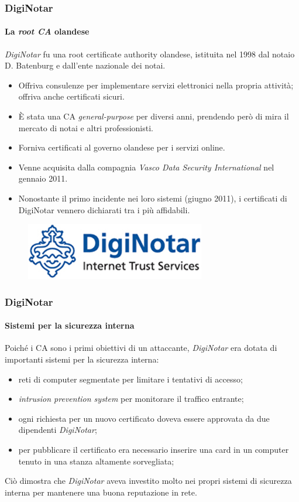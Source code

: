 \documentclass{beamer}
\begin{document}
\begin{frame}
\frametitle{DigiNotar}
\framesubtitle{La \textit{root CA} olandese}
\textit{\alert{DigiNotar}} fu una \alert{root certificate authority} olandese, istituita nel 1998 dal notaio D. Batenburg e dall'ente nazionale dei notai.
\begin{itemize}
	\item Offriva consulenze per implementare servizi elettronici nella propria attività; offriva anche \alert{certificati sicuri}.
	\item È stata una \alert{CA \textit{general-purpose}} per diversi anni, prendendo però di mira il mercato di notai e altri professionisti.
	\item Forniva certificati al \alert{governo olandese} per i servizi online.
	\item Venne acquisita dalla compagnia \alert{\textit{Vasco Data Security International}} nel gennaio 2011.
	\item Nonostante il \alert{primo incidente} nei loro sistemi (giugno 2011), i \alert{certificati} di DigiNotar vennero dichiarati tra i \alert{più affidabili}.
\end{itemize}
\begin{figure}[H]
	\centering
	\includegraphics[scale=0.45]{diginotar}
\end{figure}
	
\end{frame}

\begin{frame}
\frametitle{DigiNotar}
\framesubtitle{Sistemi per la sicurezza interna}
Poiché i CA sono i primi obiettivi di un attaccante, \textit{DigiNotar} era dotata di importanti sistemi per la sicurezza interna:
\begin{itemize}
	\item reti di computer segmentate per limitare i tentativi di accesso;
	\item \alert{\textit{intrusion prevention system}} per monitorare il traffico entrante;
	\item ogni \alert{richiesta} per un \alert{nuovo certificato} doveva essere approvata da due dipendenti \textit{DigiNotar};
	\item per \alert{pubblicare} il \alert{certificato} era necessario inserire una card in un computer tenuto in una stanza altamente sorvegliata;
	\newline
\end{itemize}
Ciò dimostra che \textit{DigiNotar} aveva investito molto nei propri sistemi di sicurezza interna per mantenere una buona reputazione in rete.
\end{frame}
\end{document}
